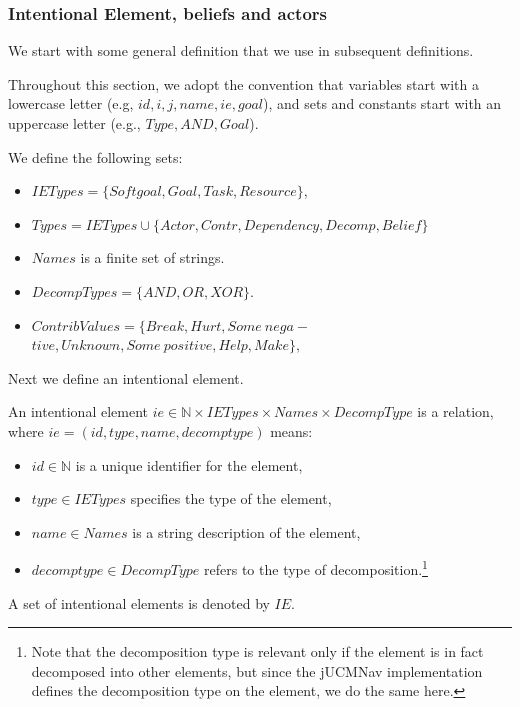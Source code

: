 \subsubsection{Intentional Element, beliefs and actors}

We start with some general definition that we use in subsequent definitions.

\begin{definition}
\label{def:set-definitions}
Throughout this section, we adopt the convention that variables start with a lowercase letter (e.g, $id, i, j, name, ie, goal$), and sets and constants start with an uppercase letter (e.g., $Type, AND, Goal$).

We define the following sets:
\begin{itemize}
\item $IETypes = \{Softgoal, Goal, Task, Resource\}$,
\item $Types = IETypes \cup \{Actor, Contr, Dependency, Decomp, Belief\}$
\item $Names$ is a finite set of strings.
\item $DecompTypes = \{AND,OR,XOR\}$.
\item $ContribValues = \{Break, Hurt, Some\ nega-$ $tive, Unknown, Some\  positive, Help, Make\},$
\end{itemize}
\end{definition}

Next we define an intentional element.

\begin{definition}
\label{def:ie}
An intentional element $ie\in \mathbb{N}\times IETypes\times Names\times DecompType$ is a relation, where $ie = (id, type, name, decomptype)$ means:
\begin{itemize}
\item $id\in \mathbb{N}$ is a unique identifier for the element,
\item $type\in IETypes$ specifies the type of the element,
\item $name \in Names$ is a string description of the element,
\item $decomptype\in DecompType$ refers to the type of decomposition.\footnote{Note that the decomposition type is relevant only if the element is in fact decomposed into other elements, but since the jUCMNav implementation defines the decomposition type on the element, we do the same here.}
\end{itemize}
A set of intentional elements is denoted by $IE$.
\end{definition}

